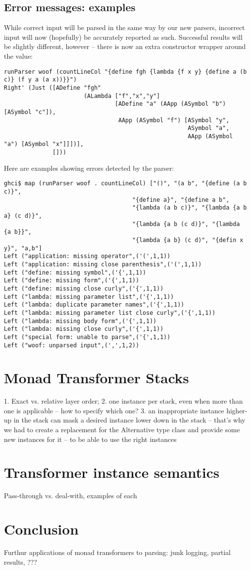 \documentclass{tmr}
\begin{document}
\subsection{Error messages:  examples}
While correct input will be parsed in the same way by our new parsers, incorrect input will now (hopefully) be
accurately reported as such.  Successful results will be slightly different, however -- there is now an extra
constructor wrapper around the value:
\begin{verbatim}
runParser woof (countLineCol "{define fgh {lambda {f x y} {define a (b c)} (f y a (a x))}}")
Right' (Just ([ADefine "fgh" 
                       (ALambda ["f","x","y"] 
                                [ADefine "a" (AApp (ASymbol "b") [ASymbol "c"]),
                                 AApp (ASymbol "f") [ASymbol "y",
                                                     ASymbol "a",
                                                     AApp (ASymbol "a") [ASymbol "x"]]])],
              []))
\end{verbatim}
Here are examples showing errors detected by the parser:
\begin{verbatim}
ghci$ map (runParser woof . countLineCol) ["()", "(a b", "{define (a b c)}",  
                                     "{define a}", "{define a b", 
                                     "{lambda (a b c)}", "{lambda {a b a} (c d)}", 
                                     "{lambda {a b (c d)}", "{lambda {a b}}", 
                                     "{lambda {a b} (c d)", "{defin x y}", "a,b"]
Left ("application: missing operator",('(',1,1))
Left ("application: missing close parenthesis",('(',1,1))
Left ("define: missing symbol",('{',1,1))
Left ("define: missing form",('{',1,1))
Left ("define: missing close curly",('{',1,1))
Left ("lambda: missing parameter list",('{',1,1))
Left ("lambda: duplicate parameter names",('{',1,1))
Left ("lambda: missing parameter list close curly",('{',1,1))
Left ("lambda: missing body form",('{',1,1))
Left ("lambda: missing close curly",('{',1,1))
Left ("special form: unable to parse",('{',1,1))
Left ("woof: unparsed input",(',',1,2))
\end{verbatim}



\section{Monad Transformer Stacks}

1. Exact vs. relative layer order; 
2. one instance per stack, even when more than one is applicable --
how to specify which one?
3. an inappropriate instance higher-up in the stack can mask a 
desired instance lower down in the stack -- that's why we had to
create a replacement for the Alternative type class and provide
some new instances for it -- to be able to use the right instances



\section{Transformer instance semantics}

Pass-through vs. deal-with, examples of each


\section{Conclusion}
Furthur applications of monad transformers to parsing:  junk logging, partial results, ???



\end{document}
